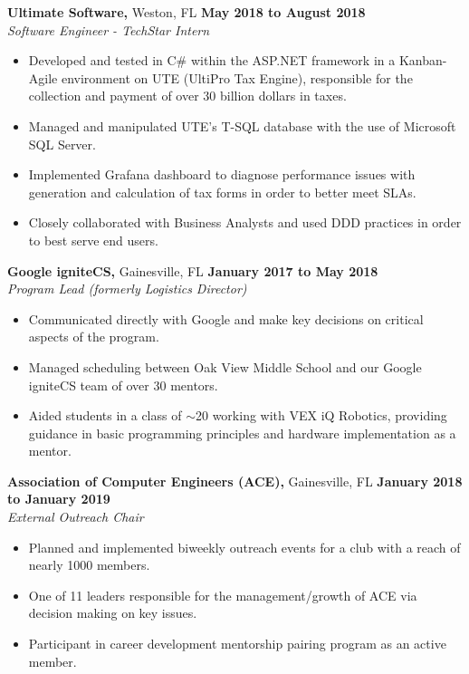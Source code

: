 \documentclass[11pt]{article} %
\begin{document}
		\vspace{.1cm}
		
		\noindent \textbf{Ultimate Software,} Weston, FL \hfill\textbf{May 2018 to August 2018}\\
		\textit{Software Engineer - TechStar Intern}
		\begin{itemize}[noitemsep,nolistsep, label = {-}]
			\item Developed and tested in C\# within the ASP.NET framework in a Kanban-Agile environment on UTE (UltiPro Tax Engine), responsible for the collection and payment of over 30 billion dollars in taxes.
			\item Managed and manipulated UTE's T-SQL database with the use of Microsoft SQL Server.
			\item Implemented Grafana dashboard to diagnose performance issues with generation and calculation of tax forms in order to better meet SLAs.
			\item Closely collaborated with Business Analysts and used DDD practices in order to best serve end users.
		\end{itemize}
		\vspace{.1cm}
		
		\noindent \textbf{Google igniteCS,} Gainesville, FL \hfill\textbf{January 2017 to May 2018}\\
		\textit{Program Lead (formerly Logistics Director)}
		\begin{itemize}[noitemsep,nolistsep, label = {-}]
			\item Communicated directly with Google and make key decisions on critical aspects of the program.
			\item Managed scheduling between Oak View Middle School and our Google igniteCS team of over 30 mentors.
			\item Aided students in a class of $\sim$20 working with VEX iQ Robotics, providing guidance in basic programming principles and hardware implementation as a mentor.
		\end{itemize} 
		\vspace{.1cm}
		
		\noindent \textbf{Association of Computer Engineers (ACE),} Gainesville, FL \hfill\textbf{January 2018 to January 2019}\\
		\textit{External Outreach Chair}
		\begin{itemize}[noitemsep,nolistsep, label={-}]
			\item Planned and implemented biweekly outreach events for a club with a reach of nearly 1000 members.
			\item One of 11 leaders responsible for the management/growth of ACE via decision making on key issues.
			\item Participant in career development mentorship pairing program as an active member.
		\end{itemize}
		\vspace{.1cm}
	
\end{document}
